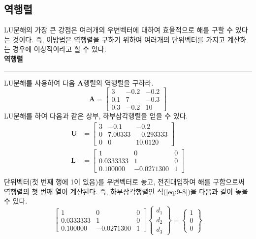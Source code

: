\subsection{역행렬}
LU분해의 가장 큰 강점은 여러개의 우변벡터에 대하여 효율적으로 해를 구할 수 있다는 것이다. 즉, 이방법은 역행렬을 구하기 위하여 여러개의 단위벡터를 가지고 계산하는 경우에 이상적이라고 할 수 있다.
\\
 \textbf{역행렬}\\
\rule{\textwidth}{0.1pt}
LU분해를 사용하여 다음 $\mathbf{A}$행렬의 역행렬을 구하라.
\begin{equation*}
\mathbf{A}=\begin{bmatrix}3&-0.2&-0.2\\0.1&7&-0.3\\0.3&-0.2&10\end{bmatrix}
\end{equation*}
LU분해를 하여 다음과 같은 상부, 하부삼각행렬을 얻을 수 있다.
\begin{align*}
\mathbf{U}&=\begin{bmatrix}3&-0.1&-0.2\\0&7.00333&-0.293333\\0&0&10.0120\end{bmatrix}\\
\mathbf{L}&=\begin{bmatrix}1&0&0\\0.0333333&1&0\\0.100000&-0.0271300&1\end{bmatrix}\\
\end{align*}
 단위벡터(첫 번째 행에 1이 있음)를 우변벡터로 놓고, 전진대입하여 해를 구함으로써 역행렬의 첫 번째 열이 계산된다. 즉, 하부삼각행렬인 식(\ref{eq:9-8})을 다음과 같이 놓을 수 있다.
\begin{equation*}
\begin{bmatrix}1&0&0\\0.0333333&1&0\\0.100000&-0.0271300&1\end{bmatrix}\begin{Bmatrix}d_{1}\\d_{2}\\d_{3}\end{Bmatrix}=\begin{Bmatrix}1\\0\\0\end{Bmatrix}
\end{equation*}
